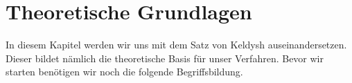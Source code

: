 \chapter{Theoretische Grundlagen}

In diesem Kapitel werden wir uns mit dem Satz von Keldysh auseinandersetzen.
Dieser bildet nämlich die theoretische Basis für unser Verfahren.
Bevor wir starten benötigen wir noch die folgende Begriffsbildung.






